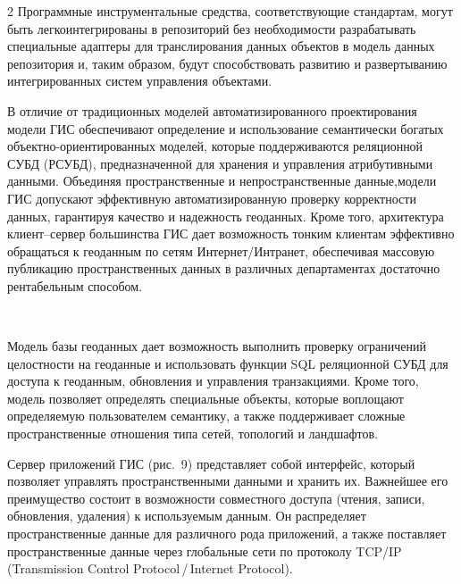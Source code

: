 \begin{multicols}{2}
Программные инструментальные средства, 
соответствующие стандартам, могут быть легко\linebreak интегрированы в репозиторий без 
необходимости разрабатывать специальные адаптеры для транслирования данных 
объектов в модель данных репозитория и, таким образом, будут способствовать развитию 
и развертыванию интегрированных систем управления объектами.
      
      В отличие от традиционных моделей автома\-тизированного проектирования 
модели ГИС обеспе\-чи\-вают определение и использование семантически богатых 
      объект\-но-ори\-ен\-ти\-ро\-ван\-ных моделей, которые поддерживаются реляционной СУБД 
(РСУБД), предназначенной для хранения и управ\-ле\-ния атрибутивными данными. 
Объединяя пространственные и непространственные данные,\linebreak модели ГИС допускают 
эффективную автоматизированную проверку корректности данных, гарантируя качество и 
надежность геоданных. Кроме того, архитектура кли\-ент--сер\-вер большинства ГИС дает 
возможность тонким клиентам эффективно обращаться к геоданным по сетям 
Интернет/Интранет, обеспечивая массовую публикацию пространственных данных в 
различных департаментах достаточно рентабельным способом. 


\begin{figure} %
 \vspace*{1pt}
 \begin{center}
 \mbox{%
 \epsfxsize=135.585mm
 }
 \end{center}
 \vspace*{-9pt}
\vspace*{6pt}
\end{figure}                    
      
      Модель базы геоданных дает возможность выполнить проверку ограничений 
целостности на геоданные и использовать функции SQL реляционной СУБД для доступа к 
геоданным, обновления и управ\-ле\-ния транзакциями. Кроме того, модель позволяет 
определять специальные объекты, которые воплощают определяемую пользователем 
семантику, а также поддерживает сложные пространственные отношения типа сетей, 
топологий и ландшафтов. 
     
     Сервер приложений ГИС (рис.~9) представляет собой интерфейс, который 
позволяет управлять пространственными данными и хранить их. Важнейшее его 
преимущество состоит в возможности совместного доступа (чтения, записи, 
обновления, удаления) к используемым данным. Он распределяет пространственные 
данные для различного рода приложений, а также поставляет пространственные данные 
через глобальные сети по протоколу TCP/IP (Transmission Control Protocol\,/\,Internet
Protocol). 
     

\end{multicols}
